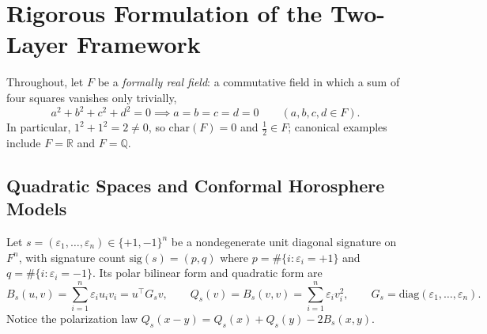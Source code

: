 \documentclass[11pt]{article}
\theoremstyle{definition}
\newcommand{\diag}{\mathrm{diag}}
\newcommand{\sig}{\mathrm{sig}}
\begin{document}
\section{Rigorous Formulation of the Two-Layer Framework}

Throughout, let $F$ be a \emph{formally real field}: a commutative field in which a sum of four squares vanishes only trivially,
\begin{equation}\label{eq:formally-real}
  a^2 + b^2 + c^2 + d^2 = 0 \implies a = b = c = d = 0 \qquad (a, b, c, d \in F).
\end{equation}
In particular, $1^2 + 1^2 = 2 \neq 0$, so $\mathrm{char}(F) = 0$ and $\frac{1}{2} \in F$; canonical examples include $F = \mathbb{R}$ and $F = \mathbb{Q}$.

\subsection{Quadratic Spaces and Conformal Horosphere Models}

Let $s = (\varepsilon_1, \dots, \varepsilon_n) \in \{+1, -1\}^n$ be a nondegenerate unit diagonal signature on $F^n$, with signature count $\sig(s) = (p, q)$ where $p = \#\{i : \varepsilon_i = +1\}$ and $q = \#\{i : \varepsilon_i = -1\}$. Its polar bilinear form and quadratic form are
\[
  B_s(u, v) = \sum_{i=1}^n \varepsilon_i u_i v_i = u^\top G_s v, \qquad Q_s(v) = B_s(v, v) = \sum_{i=1}^n \varepsilon_i v_i^2, \qquad G_s = \diag(\varepsilon_1, \dots, \varepsilon_n).
\]
Notice the polarization law $Q_s(x - y) = Q_s(x) + Q_s(y) - 2 B_s(x, y)$.
\end{document}

